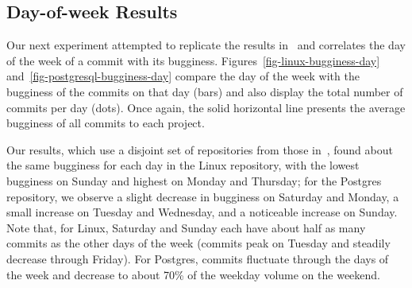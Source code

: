 \subsection{Day-of-week Results}
\label{sec-day-of-week}
Our next experiment attempted to replicate the results
in~\cite{sliwerski-msr-2005} and correlates the day of the week
of a commit with its bugginess. Figures~\ref{fig-linux-bugginess-day} 
and~\ref{fig-postgresql-bugginess-day} compare the day of the week
with the bugginess of the commits on that day (bars) and also display
the total number of commits per day (dots). Once again, the solid
horizontal line presents the average bugginess of all commits to
each project.

Our results, which use a disjoint set of repositories from those
in~\cite{sliwerski-msr-2005}, found about the same bugginess for each
day in the Linux repository, with the lowest bugginess on Sunday and
highest on Monday and Thursday; for the Postgres repository, we
observe a slight decrease in bugginess on Saturday and Monday, a small
increase on Tuesday and Wednesday, and a noticeable increase on
Sunday.  Note that, for Linux, Saturday and Sunday each have about
half as many commits as the other days of the week (commits peak on
Tuesday and steadily decrease through Friday). For Postgres, commits
fluctuate through the days of the week and decrease to about 70\% of
the weekday volume on the weekend.


